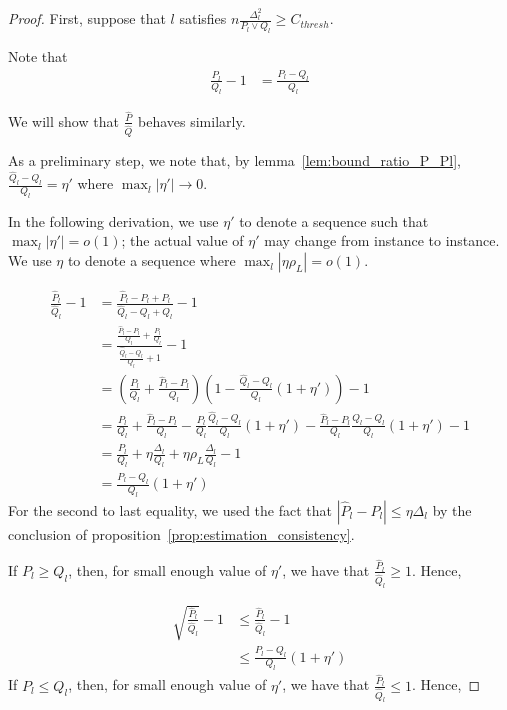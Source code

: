 \begin{proof}
First, suppose that $l$ satisfies $n \frac{\Delta_l^2}{P_l \vee Q_l} \geq C_{thresh}$. 

Note that 
\begin{align*}
 \frac{P_l}{Q_l} - 1 &= \frac{P_l - Q_l}{Q_l}  
\end{align*}

We will show that $\frac{\hat{P}}{\hat{Q}}$ behaves similarly. 

As a preliminary step, we note that, by lemma~\ref{lem:bound_ratio_P_Pl}, $ \frac{\hat{Q}_l - Q_l}{Q_l} = \eta'$ where $\max_l |\eta'| \rightarrow 0$.

In the following derivation, we use $\eta'$ to denote a sequence such that $\max_l |\eta'| = o(1)$; the actual value of $\eta'$ may change from instance to instance. 
We use $\eta$ to denote a sequence where $\max_l |\eta \rho_L| = o(1)$.

\begin{align*}
\frac{\hat{P}_l}{\hat{Q}_l} - 1 &= 
     \frac{ \hat{P}_l - P_l + P_l }{ \hat{Q}_l - Q_l + Q_l} -1  \\
  &=  \frac{  \frac{\hat{P}_l - P_l}{Q_l} + \frac{P_l}{Q_l}}
       { \frac{\hat{Q}_l - Q_l}{Q_l} + 1} - 1 \\
 &= \left( \frac{P_l}{Q_l} + \frac{\hat{P}_l - P_l}{Q_l} \right)
    \left( 1 - \frac{\hat{Q}_l - Q_l}{Q_l} (1 + \eta')  \right) -1  \\
 &= \frac{P_l}{Q_l} + \frac{\hat{P}_l - P_l}{Q_l} 
     - \frac{P_l}{Q_l} \frac{\hat{Q}_l - Q_l}{Q_l} (1 + \eta') 
     - \frac{\hat{P}_l - P_l}{Q_l} \frac{\hat{Q}_l - Q_l}{Q_l}(1+ \eta') 
   - 1  \\
 &= \frac{P_l}{Q_l} + \eta \frac{\Delta_l}{Q_l}
     + \eta \rho_L \frac{\Delta_l}{Q_l}
   - 1  \\
 &= \frac{P_l - Q_l}{Q_l} ( 1 + \eta')
\end{align*}
For the second to last equality, we used the fact that $| \hat{P}_l - P_l| \leq \eta \Delta_l$ by the conclusion of proposition~\ref{prop:estimation_consistency}.

If $P_l \geq Q_l$, then, for small enough value of $\eta'$, we have that $\frac{\hat{P}_l}{\hat{Q}_l} \geq 1$. Hence,

\begin{align*}
\sqrt{ \frac{\hat{P}_l}{\hat{Q}_l} } - 1 &\leq \frac{\hat{P}_l}{\hat{Q}_l} - 1 \\
   &\leq \frac{P_l - Q_l}{Q_l} (1 + \eta')
\end{align*}
If $P_l \leq Q_l$, then, for small enough value of $\eta'$, we have that $\frac{\hat{P}_l}{\hat{Q}_l} \leq 1$. Hence,


\end{proof}
